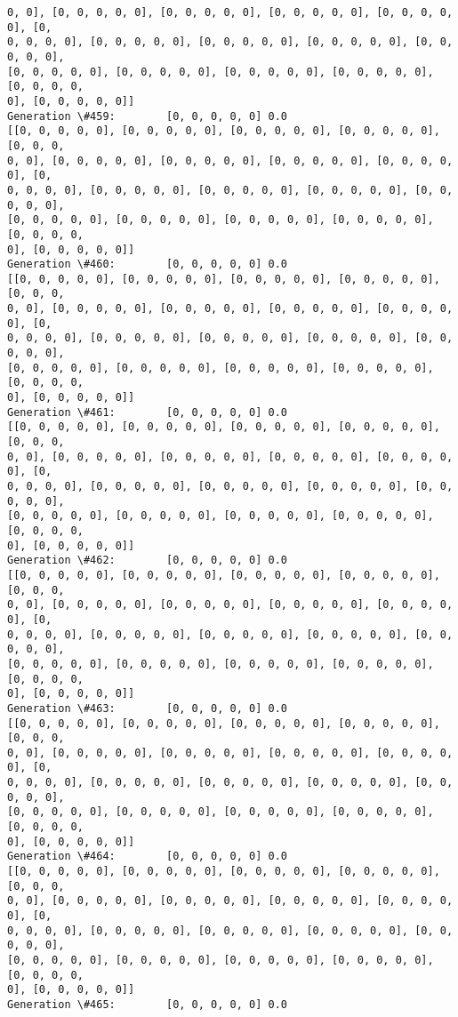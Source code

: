 \documentclass[11pt]{article}
\begin{document}
\begin{Verbatim}[commandchars=\\\{\}]
0, 0], [0, 0, 0, 0, 0], [0, 0, 0, 0, 0], [0, 0, 0, 0, 0], [0, 0, 0, 0, 0], [0,
0, 0, 0, 0], [0, 0, 0, 0, 0], [0, 0, 0, 0, 0], [0, 0, 0, 0, 0], [0, 0, 0, 0, 0],
[0, 0, 0, 0, 0], [0, 0, 0, 0, 0], [0, 0, 0, 0, 0], [0, 0, 0, 0, 0], [0, 0, 0, 0,
0], [0, 0, 0, 0, 0]]
Generation \#459:        [0, 0, 0, 0, 0] 0.0
[[0, 0, 0, 0, 0], [0, 0, 0, 0, 0], [0, 0, 0, 0, 0], [0, 0, 0, 0, 0], [0, 0, 0,
0, 0], [0, 0, 0, 0, 0], [0, 0, 0, 0, 0], [0, 0, 0, 0, 0], [0, 0, 0, 0, 0], [0,
0, 0, 0, 0], [0, 0, 0, 0, 0], [0, 0, 0, 0, 0], [0, 0, 0, 0, 0], [0, 0, 0, 0, 0],
[0, 0, 0, 0, 0], [0, 0, 0, 0, 0], [0, 0, 0, 0, 0], [0, 0, 0, 0, 0], [0, 0, 0, 0,
0], [0, 0, 0, 0, 0]]
Generation \#460:        [0, 0, 0, 0, 0] 0.0
[[0, 0, 0, 0, 0], [0, 0, 0, 0, 0], [0, 0, 0, 0, 0], [0, 0, 0, 0, 0], [0, 0, 0,
0, 0], [0, 0, 0, 0, 0], [0, 0, 0, 0, 0], [0, 0, 0, 0, 0], [0, 0, 0, 0, 0], [0,
0, 0, 0, 0], [0, 0, 0, 0, 0], [0, 0, 0, 0, 0], [0, 0, 0, 0, 0], [0, 0, 0, 0, 0],
[0, 0, 0, 0, 0], [0, 0, 0, 0, 0], [0, 0, 0, 0, 0], [0, 0, 0, 0, 0], [0, 0, 0, 0,
0], [0, 0, 0, 0, 0]]
Generation \#461:        [0, 0, 0, 0, 0] 0.0
[[0, 0, 0, 0, 0], [0, 0, 0, 0, 0], [0, 0, 0, 0, 0], [0, 0, 0, 0, 0], [0, 0, 0,
0, 0], [0, 0, 0, 0, 0], [0, 0, 0, 0, 0], [0, 0, 0, 0, 0], [0, 0, 0, 0, 0], [0,
0, 0, 0, 0], [0, 0, 0, 0, 0], [0, 0, 0, 0, 0], [0, 0, 0, 0, 0], [0, 0, 0, 0, 0],
[0, 0, 0, 0, 0], [0, 0, 0, 0, 0], [0, 0, 0, 0, 0], [0, 0, 0, 0, 0], [0, 0, 0, 0,
0], [0, 0, 0, 0, 0]]
Generation \#462:        [0, 0, 0, 0, 0] 0.0
[[0, 0, 0, 0, 0], [0, 0, 0, 0, 0], [0, 0, 0, 0, 0], [0, 0, 0, 0, 0], [0, 0, 0,
0, 0], [0, 0, 0, 0, 0], [0, 0, 0, 0, 0], [0, 0, 0, 0, 0], [0, 0, 0, 0, 0], [0,
0, 0, 0, 0], [0, 0, 0, 0, 0], [0, 0, 0, 0, 0], [0, 0, 0, 0, 0], [0, 0, 0, 0, 0],
[0, 0, 0, 0, 0], [0, 0, 0, 0, 0], [0, 0, 0, 0, 0], [0, 0, 0, 0, 0], [0, 0, 0, 0,
0], [0, 0, 0, 0, 0]]
Generation \#463:        [0, 0, 0, 0, 0] 0.0
[[0, 0, 0, 0, 0], [0, 0, 0, 0, 0], [0, 0, 0, 0, 0], [0, 0, 0, 0, 0], [0, 0, 0,
0, 0], [0, 0, 0, 0, 0], [0, 0, 0, 0, 0], [0, 0, 0, 0, 0], [0, 0, 0, 0, 0], [0,
0, 0, 0, 0], [0, 0, 0, 0, 0], [0, 0, 0, 0, 0], [0, 0, 0, 0, 0], [0, 0, 0, 0, 0],
[0, 0, 0, 0, 0], [0, 0, 0, 0, 0], [0, 0, 0, 0, 0], [0, 0, 0, 0, 0], [0, 0, 0, 0,
0], [0, 0, 0, 0, 0]]
Generation \#464:        [0, 0, 0, 0, 0] 0.0
[[0, 0, 0, 0, 0], [0, 0, 0, 0, 0], [0, 0, 0, 0, 0], [0, 0, 0, 0, 0], [0, 0, 0,
0, 0], [0, 0, 0, 0, 0], [0, 0, 0, 0, 0], [0, 0, 0, 0, 0], [0, 0, 0, 0, 0], [0,
0, 0, 0, 0], [0, 0, 0, 0, 0], [0, 0, 0, 0, 0], [0, 0, 0, 0, 0], [0, 0, 0, 0, 0],
[0, 0, 0, 0, 0], [0, 0, 0, 0, 0], [0, 0, 0, 0, 0], [0, 0, 0, 0, 0], [0, 0, 0, 0,
0], [0, 0, 0, 0, 0]]
Generation \#465:        [0, 0, 0, 0, 0] 0.0

\end{Verbatim}
\end{document}
